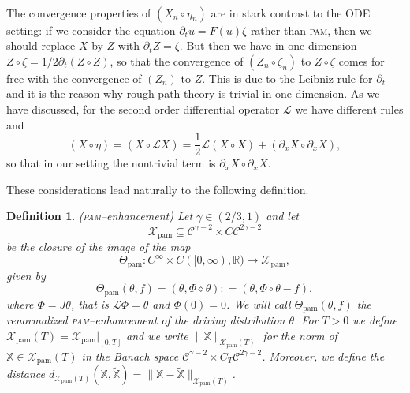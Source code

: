 \documentclass[a4paper,11pt]{article}
\newcommand{\tmname}[1]{\textsc{#1}}
\newcommand{\tmop}[1]{\ensuremath{\operatorname{#1}}}
\newtheorem{definition}{Definition}
{\theorembodyfont{\rmfamily}\newtheorem{example}{Example}}
{\theorembodyfont{\rmfamily\small}\newtheorem{exercise}{Exercise}}
\newcommand{\LL}{\mathscr{L}}
\newcommand{\CC}{\mathscr{C}}
\newcommand{\reso}{\,\mathord{\circ}\,}
\newcommand{\renorm}{\,\mathord{\diamond}\,}
\begin{document}
\

\begin{remark}
  The convergence properties of $(X_n \reso \eta_n)$ are in stark contrast to
  the ODE setting: if we consider the equation $\partial_t u = F (u) \zeta$
  rather than {\tmname{pam}}, then we should replace $X$ by $Z$ with
  $\partial_t Z = \zeta$. But then we have in one dimension $Z \reso \zeta = 1
  / 2 \partial_t (Z \reso Z)$, so that the convergence of $(Z_n \reso
  \zeta_n)$ to $Z \reso \zeta$ comes for free with the convergence of $(Z_n)$
  to $Z$. This is due to the Leibniz rule for $\partial_t$ and it is the
  reason why rough path theory is trivial in one dimension. As we have discussed, for the second order
  differential operator $\LL$ we have different rules and
  \[ (X \reso \eta) = (X \reso \LL X) = \frac{1}{2}  \LL (X \reso X) +
     (\partial_x X \reso \partial_x X), \]
  so that in our setting the nontrivial term is $\partial_x X \reso \partial_x X$.
\end{remark}

These considerations lead naturally to the following definition.

\begin{definition}
  \label{def:pam rough distribution}({\tmname{pam}}--enhancement) Let $\gamma
  \in (2 / 3, 1)$ and let
  \[ \mathcal{X}_{\tmop{pam}} \subseteq \CC^{\gamma - 2} \times C \CC^{2
     \gamma - 2} \]
  be the closure of the image of the map
  \[ \Theta_{\tmop{pam}} : C^{\infty} \times C ([0, \infty), \mathbb{R})
     \rightarrow \mathcal{X}_{\tmop{pam}}, \]
  given by
  \begin{equation}
    \Theta_{\tmop{pam}} (\theta, f) = (\theta, \Phi \renorm \theta) : =
    (\theta, \Phi \reso \theta - f), \label{eq:enhanced-pam}
  \end{equation}
  where $\Phi = J \theta$, that is $\LL \Phi = \theta$ and $\Phi (0) = 0$. We
  will call $\Theta_{\tmop{pam}} (\theta, f)$ the renormalized
  {\tmname{pam}}--enhancement of the driving distribution $\theta$. For $T >
  0$ we define $\mathcal{X}_{\tmop{pam}} (T) = \mathcal{X}_{\tmop{pam}} |_{[0,
  T]}$ and we write $\| \mathbb{X} \|_{\mathcal{X}_{\tmop{pam}} (T)}$ for the
  norm of $\mathbb{X} \in \mathcal{X}_{\tmop{pam}} (T)$ in the Banach space
  $\CC^{\gamma - 2} \times C_T \CC^{2 \gamma - 2}$. Moreover, we define the
  distance $d_{\mathcal{X}_{\tmop{pam}} (T)} (\mathbb{X},
  \tilde{\mathbb{X}}) = \|\mathbb{X}- \tilde{\mathbb{X}}
  \|_{\mathcal{X}_{\tmop{pam}} (T)}$.
\end{definition}
\end{document}
